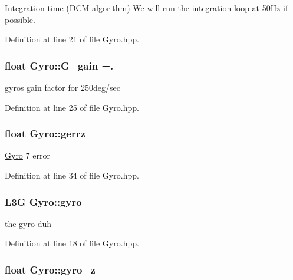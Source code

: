 Integration time (D\-C\-M algorithm) We will run the integration loop at 50\-Hz if possible. 



Definition at line 21 of file Gyro.\-hpp.

\hypertarget{classGyro_a47a4402067b812740622d729478ec1be}{
\subsubsection[{G\-\_\-gain}]{\setlength{\rightskip}{0pt plus 5cm}float Gyro\-::\-G\-\_\-gain =.\hspace{0.3cm}{\ttfamily [private]}}}\label{classGyro_a47a4402067b812740622d729478ec1be}


gyros gain factor for 250deg/sec 



Definition at line 25 of file Gyro.\-hpp.

\hypertarget{classGyro_aa725b8e8f7f7ae066c28ae67bcb310d6}{
\subsubsection[{gerrz}]{\setlength{\rightskip}{0pt plus 5cm}float Gyro\-::gerrz\hspace{0.3cm}{\ttfamily [private]}}}\label{classGyro_aa725b8e8f7f7ae066c28ae67bcb310d6}
\hyperlink{classGyro}{Gyro} 7 error 

Definition at line 34 of file Gyro.\-hpp.

\hypertarget{classGyro_ab449066006f8cdd13efcefc3542c6130}{
\subsubsection[{gyro}]{\setlength{\rightskip}{0pt plus 5cm}L3\-G Gyro\-::gyro\hspace{0.3cm}{\ttfamily [private]}}}\label{classGyro_ab449066006f8cdd13efcefc3542c6130}


the gyro duh 



Definition at line 18 of file Gyro.\-hpp.

\hypertarget{classGyro_af158408e03992ce3d5fc020d22a0f2a9}{
\subsubsection[{gyro\-\_\-z}]{\setlength{\rightskip}{0pt plus 5cm}float Gyro\-::gyro\-\_\-z\hspace{0.3cm}{\ttfamily [private]}}}\label{classGyro_af158408e03992ce3d5fc020d22a0f2a9}


